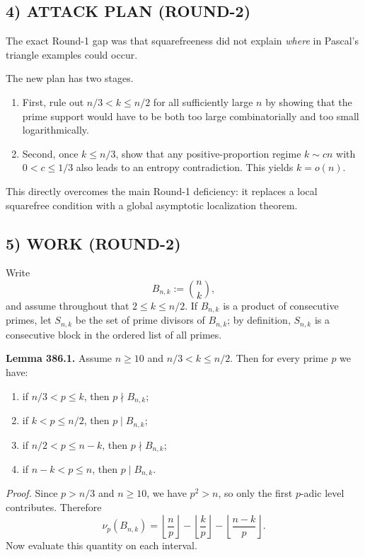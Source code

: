 \subsection*{4) ATTACK PLAN (ROUND-2)}
The exact Round-1 gap was that squarefreeness did not explain \emph{where} in Pascal's triangle examples could occur.

The new plan has two stages.

\begin{enumerate}
\item First, rule out $n/3<k\leq n/2$ for all sufficiently large $n$ by showing that the prime support would have to be both too large combinatorially and too small logarithmically.
\item Second, once $k\leq n/3$, show that any positive-proportion regime $k\sim cn$ with $0<c\leq 1/3$ also leads to an entropy contradiction. This yields $k=o(n)$.
\end{enumerate}

This directly overcomes the main Round-1 deficiency: it replaces a local squarefree condition with a global asymptotic localization theorem.

\subsection*{5) WORK (ROUND-2)}
Write
\[
B_{n,k}:=\binom{n}{k},
\]
and assume throughout that $2\leq k\leq n/2$.
If $B_{n,k}$ is a product of consecutive primes, let $S_{n,k}$ be the set of prime divisors of $B_{n,k}$; by definition, $S_{n,k}$ is a consecutive block in the ordered list of all primes.

\medskip

\textbf{Lemma 386.1.} Assume $n\geq 10$ and $n/3<k\leq n/2$. Then for every prime $p$ we have:

\begin{enumerate}
\item if $n/3<p\leq k$, then $p\nmid B_{n,k}$;
\item if $k<p\leq n/2$, then $p\mid B_{n,k}$;
\item if $n/2<p\leq n-k$, then $p\nmid B_{n,k}$;
\item if $n-k<p\leq n$, then $p\mid B_{n,k}$.
\end{enumerate}

\emph{Proof.} Since $p>n/3$ and $n\geq 10$, we have $p^2>n$, so only the first $p$-adic level contributes. Therefore
\[
\nu_p(B_{n,k})=\left\lfloor \frac np\right\rfloor-\left\lfloor \frac kp\right\rfloor-\left\lfloor \frac{n-k}{p}\right\rfloor.
\]
Now evaluate this quantity on each interval.

